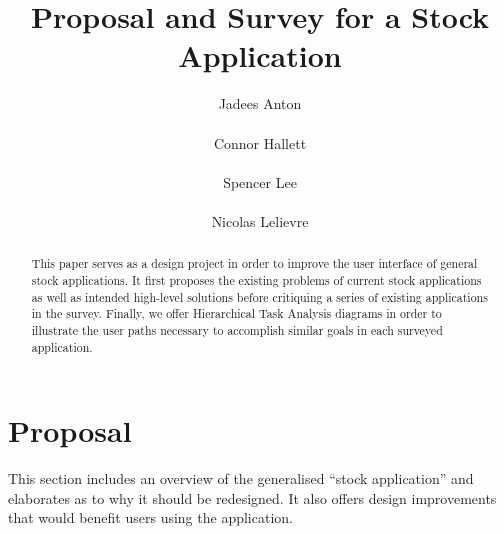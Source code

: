 \documentclass{sigchi}
\begin{document}
\title{Proposal and Survey for a Stock Application}
\author{
	\alignauthor Jadees Anton\\
		\\
	\alignauthor Connor Hallett\\
		\\
	\alignauthor Spencer Lee\\
		\\
	\alignauthor Nicolas Lelievre\\
}

\maketitle

\begin{abstract}
This paper serves as a design project in order to improve the user interface of general stock applications. It first proposes the existing problems of current stock applications as well as intended high-level solutions before critiquing a series of existing applications in the survey. Finally, we offer Hierarchical Task Analysis diagrams in order to illustrate the user paths necessary to accomplish similar goals in each surveyed application.
\end{abstract}

\section{Proposal}
This section includes an overview of the generalised ``stock application'' and elaborates as to why it should be redesigned. It also offers design improvements that would benefit users using the application.
\end{document}
